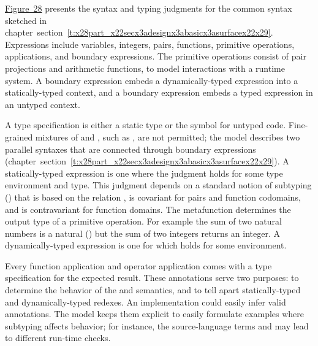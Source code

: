 \documentclass[ twoside,open=right,titlepage,numbers=noenddot,headinclude,%
                footinclude=true,cleardoublepage=empty,abstract=off,
                BCOR=5mm,paper=a4,fontsize=11pt,%
                ngerman,american,%
                parts,pdfspacing]{scrreprt}
\newcommand{\SecRef}[2]{section~#1}
\newcommand{\SecRefLocal}[3]{\hyperref[#1]{\SecRef{#2}{#3}}}
\newcommand{\FigureRef}[2]{#1}
\renewcommand{\SecRefLocal}[3]{section~\ref{#1}}
\begin{document}
\hyperref[t:x28counter_x28x22figurex22_x22figx3asurfacex2dlanguagex22x29x29]{Figure~\FigureRef{28}{t:x28counter_x28x22figurex22_x22figx3asurfacex2dlanguagex22x29x29}} presents the syntax and typing judgments for
 the common syntax sketched in chapter~\SecRefLocal{t:x28part_x22secx3adesignx3abasicx3asurfacex22x29}{4.4.1}{Surface Language}.
Expressions \relax{$\sexpr$} include variables, integers, pairs, functions,
 primitive operations, applications, and boundary expressions.
The primitive operations consist of pair projections
 and arithmetic functions, to model interactions with a runtime system.
A \relax{$\sdyn$} boundary expression embeds a dynamically{-}typed expression into
 a statically{-}typed context,
 and a \relax{$\ssta$} boundary expression embeds a typed expression in an untyped context.

A type specification \relax{$\stoptional$} is either a static type \relax{$\stype$}
 or the symbol \relax{$\tdyn$} for untyped code.
Fine{-}grained mixtures of \relax{$\stype$} and \relax{$\tdyn$}, such as \relax{$\tpair{\tint}{\tdyn}$},
 are not permitted; the model describes two parallel syntaxes
 that are connected through boundary expressions (chapter~\SecRefLocal{t:x28part_x22secx3adesignx3abasicx3asurfacex22x29}{4.4.1}{Surface Language}).
A statically{-}typed expression  is one where the judgment
  holds for some type environment
 and type.
This judgment depends on a standard notion of subtyping (\relax{$\subteq$}) that is
 based on the relation \relax{$\tnat \subteq \tint$}, is covariant for pairs and
 function codomains, and is contravariant for function domains.
The metafunction \relax{$\sDelta$} determines the output type of a primitive operation.
For example the sum of two natural numbers is a natural (\relax{$\sDelta(\ssum, \tnat, \tnat) = \tnat$})
 but the sum of two integers returns an integer.
A dynamically{-}typed expression  is one for which
  holds for some environment.

Every function application and operator application comes with a type
 specification \relax{$\stoptional$} for the expected result.
These annotations serve two purposes:
 to determine the behavior of the \relax{\tname} and \relax{\aname} semantics,
 and to tell apart statically{-}typed and dynamically{-}typed redexes.
An implementation could easily infer valid annotations.
The model keeps them explicit to easily formulate examples where subtyping
 affects behavior; for instance, the source{-}language terms
  and
  may lead to different run{-}time checks.
\end{document}
